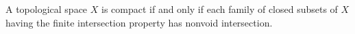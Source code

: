 A topological space $X$ is compact if and only if each family of closed subsets of $X$ having the finite intersection property has nonvoid intersection.
